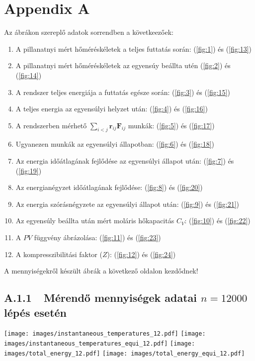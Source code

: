 \section*{Appendix A} \label{A}

Az ábrákon szereplő adatok sorrendben a követkeezőek:
\begin{enumerate}
    \item A pillanatnyi mért hőméréskéletek a teljes futtatás során: (\ref{fig:1}) és (\ref{fig:13})
    \item A pillanatnyi mért hőméréskéletek az egyensúy beállta utén (\ref{fig:2}) és (\ref{fig:14})
    \item A rendszer teljes energiája a futtatás egésze során: (\ref{fig:3}) és (\ref{fig:15})
    \item A teljes energia az egyensúlyi helyzet után: (\ref{fig:4}) és (\ref{fig:16})
    \item A rendszerben mérhető $\sum_{i < j} \boldsymbol{r}_{ij} \boldsymbol{F}_{ij}$ munkák: (\ref{fig:5}) és (\ref{fig:17})
    \item Ugyanezen munkák az egyensúlyi állapotban: (\ref{fig:6}) és (\ref{fig:18})
    \item Az energia időátlagának fejlődése az egyensúlyi állapot után: (\ref{fig:7}) és (\ref{fig:19})
    \item Az energianégyzet időátlagának fejlődése: (\ref{fig:8}) és (\ref{fig:20})
    \item Az energia szórásnégyzete az egyensúlyi állapot után: (\ref{fig:9}) és (\ref{fig:21})
    \item Az egyensúly beállta után mért moláris hőkapacitás $C_{V}$: (\ref{fig:10}) és (\ref{fig:22})
    \item A $PV$ függvény ábrázolása: (\ref{fig:11}) és (\ref{fig:23})
    \item A kompresszibilitási faktor ($Z$): (\ref{fig:12}) és (\ref{fig:24})
\end{enumerate}
A mennyiségekről készült ábrák a következő oldalon kezdődnek!

\newpage

\subsection*{A.1.1\ \ Mérendő mennyiségek adatai $n=12000$ lépés esetén} \label{A.1.1}

{\centering\texttt{[image: images/instantaneous\_temperatures\_12.pdf]}}
 \label{fig:1}
\hfill \break \break
{\centering\texttt{[image: images/instantaneous\_temperatures\_equi\_12.pdf]}}
 \label{fig:2}
\hfill \break \break
{\centering\texttt{[image: images/total\_energy\_12.pdf]}}
 \label{fig:3}
\hfill \break \break
{\centering\texttt{[image: images/total\_energy\_equi\_12.pdf]}}
 \label{fig:4}

